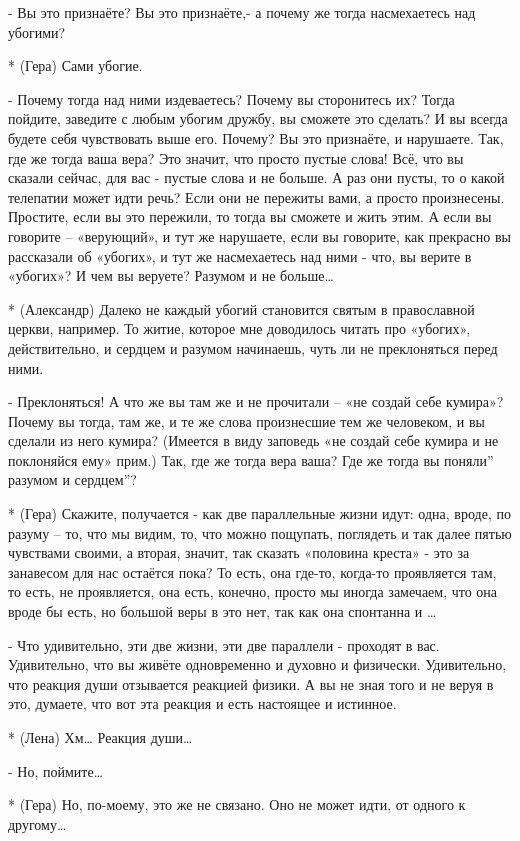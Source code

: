 - Вы это признаёте? Вы это признаёте,- а почему же тогда насмехаетесь над убогими?

* (Гера) Сами убогие.

- Почему тогда над ними издеваетесь? Почему вы сторонитесь их? Тогда пойдите, заведите с любым убогим дружбу, вы сможете это сделать? И вы всегда будете себя чувствовать выше его. Почему? Вы это признаёте, и нарушаете. Так, где же тогда ваша вера? Это значит, что просто пустые слова! Всё, что вы сказали сейчас, для вас - пустые слова и не больше. А раз они пусты, то о какой телепатии может идти речь? Если они не пережиты вами, а просто произнесены. Простите, если вы это пережили, то тогда вы сможете и жить этим. А если вы говорите – «верующий», и тут же нарушаете, если вы говорите, как прекрасно вы рассказали об «убогих», и тут же насмехаетесь над ними - что, вы верите в «убогих»? И чем вы веруете? Разумом и не больше…

* (Александр) Далеко не каждый убогий становится святым в православной церкви, например. То житие, которое мне доводилось читать про «убогих», действительно, и сердцем и разумом начинаешь, чуть ли не преклоняться перед ними.

- Преклоняться! А что же вы там  же и не прочитали – «не создай себе кумира»? Почему вы тогда, там же, и те же слова произнесшие тем же человеком, и вы сделали из него кумира? (Имеется в виду заповедь «не создай себе кумира и не поклоняйся ему» прим.) Так, где же тогда вера ваша? Где же тогда вы поняли” разумом и сердцем”?

* (Гера) Скажите, получается - как две параллельные жизни идут: одна, вроде, по разуму – то, что мы видим, то, что можно пощупать, поглядеть и так далее пятью чувствами своими, а вторая, значит, так сказать «половина креста» - это за занавесом для нас остаётся пока? То есть, она где-то, когда-то проявляется там, то есть, не проявляется, она есть, конечно, просто мы иногда замечаем, что она вроде бы есть, но большой веры в это нет, так как она спонтанна и …

 - Что удивительно, эти две жизни, эти две параллели - проходят в вас. Удивительно, что вы живёте одновременно и духовно и физически. Удивительно, что реакция души отзывается реакцией физики. А вы не зная того и не веруя в это, думаете, что вот эта реакция и есть настоящее и истинное.

* (Лена) Хм… Реакция души…

- Но, поймите…

* (Гера) Но, по-моему, это же не связано. Оно не может идти, от одного к другому…


